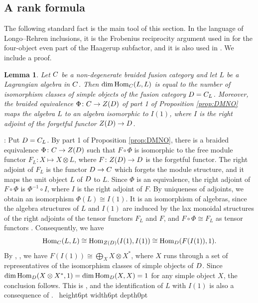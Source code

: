 \documentclass[leqno]{article}
\let\cal\relax
\newcommand{\cal}{\mathcal}
\newcommand{\qed}{\hfill \vrule height6pt  width6pt depth0pt}
\newcommand{\co}{\colon}
\newcommand{\ot}{\otimes}
\newtheorem{lemma}[thm]{Lemma}
\newenvironment{proof}[1][]{\noindent {\it Proof #1} : }{\hbox{~}\qed
\smallskip
}
\numberwithin{equation}{section}
\begin{document}
\subsection{A rank formula}

The following standard fact is the main tool of this section. In the language of Longo--Rehren inclusions, it is the Frobenius reciprocity argument used in \cite[p.~19]{EvG11} for the four-object even part of the Haagerup subfactor, and it is also used in \cite[(23) p.~7]{Hua26}. We include a proof.

\begin{lemma}
\label{lem:rank}
Let $\cal C$ be a non-degenerate braided fusion category and let $L$ be a Lagrangian algebra in $\cal C$. Then $\dim \operatorname{Hom}_{\cal C}(L,L)$ is equal to the number of isomorphism classes of simple objects of the fusion category $\cal D = \cal C_L$. Moreover, the braided equivalence $\Phi \co \cal C \to Z(\cal D)$ of part 1 of Proposition \ref{prop:DMNO} maps the algebra $L$ to an algebra isomorphic to $I(1)$, where $I$ is the right adjoint of the forgetful functor $Z(\cal D) \to \cal D$.
\end{lemma}

\begin{proof}
Put $\cal D = \cal C_L$. By part 1 of Proposition \ref{prop:DMNO}, there is a braided equivalence $\Phi \co \cal C \to Z(\cal D)$ such that $F \circ \Phi$ is isomorphic to the free module functor $F_L \co X \mapsto X \ot L$, where $F \co Z(\cal D) \to \cal D$ is the forgetful functor. The right adjoint of $F_L$ is the functor $\cal D \to \cal C$ which forgets the module structure, and it maps the unit object $L$ of $\cal D$ to $L$. Since $\Phi$ is an equivalence, the right adjoint of $F \circ \Phi$ is $\Phi^{-1} \circ I$, where $I$ is the right adjoint of $F$. By uniqueness of adjoints, we obtain an isomorphism $\Phi(L) \cong I(1)$. It is an isomorphism of algebras, since the algebra structures of $L$ and $I(1)$ are induced by the lax monoidal structures of the right adjoints of the tensor functors $F_L$ and $F$, and $F \circ \Phi \cong F_L$ as tensor functors \cite[Lemma 3.9 p.~10]{DMNO13}. Consequently, we have
\[
\operatorname{Hom}_{\cal C}(L,L)
\cong \operatorname{Hom}_{Z(\cal D)}(I(1),I(1))
\cong \operatorname{Hom}_{\cal D}(F(I(1)),1).
\]
By \cite[Proposition 5.4 p.~21]{ENO05}, \cite[Proposition 9.2.2 p.~278]{EGNO15}, we have $F(I(1)) \cong \bigoplus_{X} X \ot X^*$, where $X$ runs through a set of representatives of the isomorphism classes of simple objects of $\cal D$. Since $\dim \operatorname{Hom}_{\cal D}(X \ot X^*,1) = \dim \operatorname{Hom}_{\cal D}(X,X) = 1$ for any simple object $X$, the conclusion follows. This is \cite[Proposition 5.6 p.~21]{ENO05}, and the identification of $L$ with $I(1)$ is also a consequence of \cite[Proposition 4.4 p.~16]{DMNO13}.
\end{proof}
\end{document}
